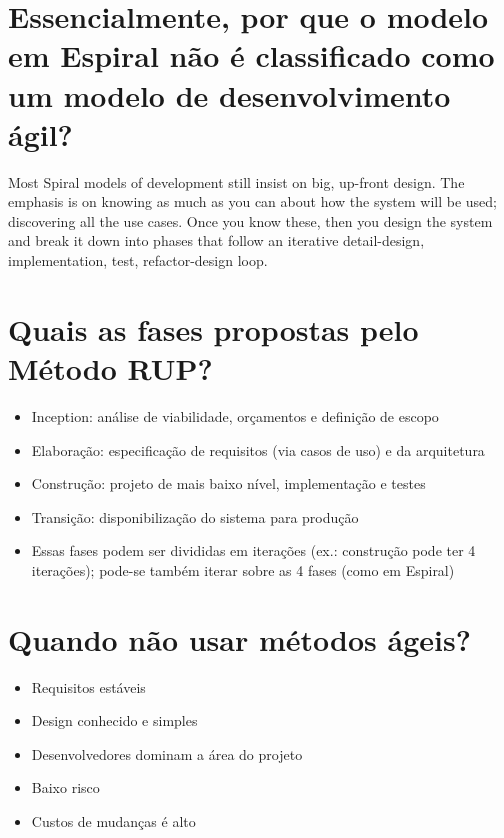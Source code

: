 \documentclass[11pt]{article}
\begin{document}
\section{Essencialmente, por que o modelo em Espiral não é classificado como um modelo de desenvolvimento ágil?}
\label{sec:orgd7afb1a}
Most Spiral models of development still insist on big, up-front design. The emphasis is
on knowing as much as you can about how the system will be used; discovering all the use
cases. Once you know these, then you design the system and break it down into phases that
follow an iterative detail-design, implementation, test, refactor-design loop.
\section{Quais as fases propostas pelo Método RUP?}
\label{sec:orgcd95272}
\begin{itemize}
\item Inception: análise de viabilidade, orçamentos e definição de escopo
\item Elaboração: especificação de requisitos (via casos de uso) e da arquitetura
\item Construção: projeto de mais baixo nível, implementação e testes
\item Transição: disponibilização do sistema para produção
\item Essas fases podem ser divididas em iterações (ex.: construção pode ter 4 iterações); pode-se também iterar sobre as 4 fases (como em Espiral)
\end{itemize}


\section{Quando não usar métodos ágeis?}
\label{sec:org98dc649}
\begin{itemize}
\item Requisitos estáveis
\item Design conhecido e simples
\item Desenvolvedores dominam a área do projeto
\item Baixo risco
\item Custos de mudanças é alto
\end{itemize}
\end{document}
